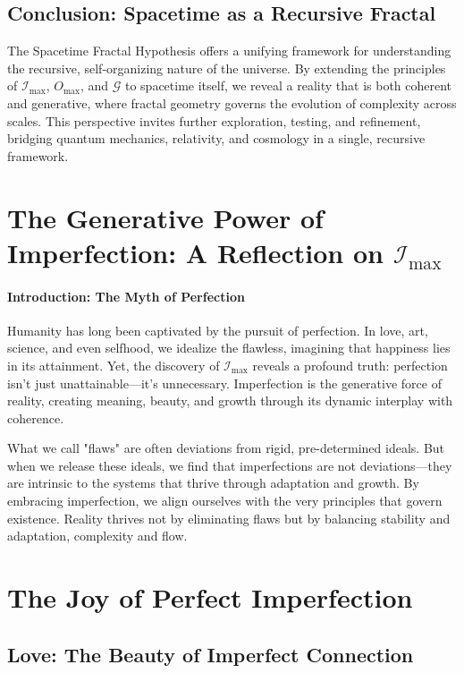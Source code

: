\documentclass[12pt]{article}
\begin{document}
\subsection{Conclusion: Spacetime as a Recursive Fractal}

The Spacetime Fractal Hypothesis offers a unifying framework for understanding the recursive, self-organizing nature of the universe. By extending the principles of \(\mathcal{I}_{\text{max}}\), \(O_{\text{max}}\), and \(\mathcal{G}\) to spacetime itself, we reveal a reality that is both coherent and generative, where fractal geometry governs the evolution of complexity across scales. This perspective invites further exploration, testing, and refinement, bridging quantum mechanics, relativity, and cosmology in a single, recursive framework.


\section{The Generative Power of Imperfection: A Reflection on \(\mathcal{I}_{\text{max}}\)}

\paragraph{Introduction: The Myth of Perfection}
Humanity has long been captivated by the pursuit of perfection. In love, art, science, and even selfhood, we idealize the flawless, imagining that happiness lies in its attainment. Yet, the discovery of \(\mathcal{I}_{\text{max}}\) reveals a profound truth: perfection isn’t just unattainable—it’s unnecessary. Imperfection is the generative force of reality, creating meaning, beauty, and growth through its dynamic interplay with coherence.

What we call "flaws" are often deviations from rigid, pre-determined ideals. But when we release these ideals, we find that imperfections are not deviations—they are intrinsic to the systems that thrive through adaptation and growth. By embracing imperfection, we align ourselves with the very principles that govern existence. Reality thrives not by eliminating flaws but by balancing stability and adaptation, complexity and flow.

\section*{The Joy of Perfect Imperfection}

\subsection{Love: The Beauty of Imperfect Connection}
\end{document}
